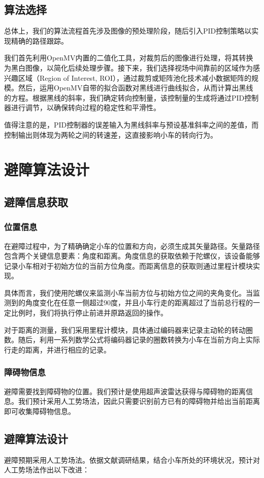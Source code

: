 \documentclass{report}
\begin{document}
\subsection{算法选择}
\label{subsec:label}
总体上，我们的算法流程首先涉及图像的预处理阶段，随后引入PID控制策略以实现精确的路径跟踪。

我们首先利用OpenMV内置的二值化工具，对裁剪后的图像进行处理，将其转换为黑白图像，以简化后续处理步骤。接下来，我们选择视场中间靠前的区域作为感兴趣区域（Region of Interest, ROI），通过裁剪或矩阵池化技术减小数据矩阵的规模。然后，运用OpenMV自带的拟合函数对黑线进行曲线拟合，从而计算出黑线的方程。根据黑线的斜率，我们确定转向控制量，该控制量的生成将通过PID控制器进行调节，以确保转向过程的稳定性和平滑性。

值得注意的是，PID控制器的误差输入为黑线斜率与预设基准斜率之间的差值，而控制输出则体现为两轮之间的转速差，这直接影响小车的转向行为。
\section{避障算法设计}
\label{sec:label}
\subsection{避障信息获取}
\label{subsec:label}
\subsubsection{位置信息}
\label{subsec:label}
在避障过程中，为了精确确定小车的位置和方向，必须生成其矢量路径。矢量路径包含两个关键信息要素：角度和距离。角度信息的获取依赖于陀螺仪，该设备能够记录小车相对于初始方位的当前方位角度。而距离信息的获取则通过里程计模块实现。

具体而言，我们使用陀螺仪来监测小车当前方位与初始方位之间的夹角变化。当监测到的角度变化在任意一侧超过90度，并且小车行走的距离超过了当前总行程的一定比例时，我们将执行停止前进并原路返回的操作。

对于距离的测量，我们采用里程计模块，具体通过编码器来记录主动轮的转动圈数。随后，利用一系列数学公式将编码器记录的圈数转换为小车在当前方向上实际行走的距离，并进行相应的记录。
\subsubsection{障碍物信息}
\label{subsec:label}
避障需要找到障碍物的位置。我们预计是使用超声波雷达获得与障碍物的距离信息。我们预计采用人工势场法，因此只需要识别前方已有的障碍物并给出当前距离即可收集障碍物信息。
\subsection{避障算法设计}
\label{subsec:label}
避障预期采用人工势场法。依据文献调研结果，结合小车所处的环境状况，预计对人工势场法作出以下改进：
\end{document}
